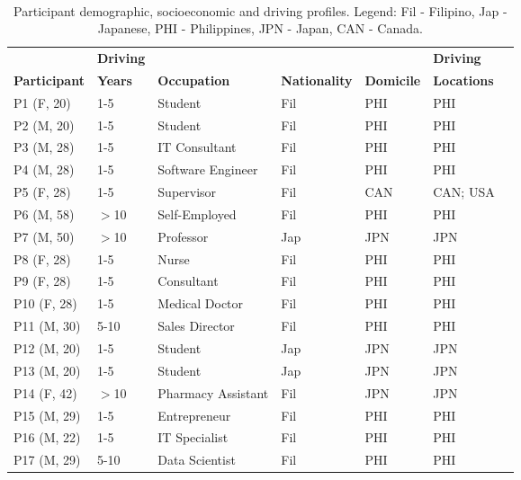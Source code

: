 \begin{table}[t]
	\centering
    \caption{Participant demographic, socioeconomic and driving profiles. Legend: Fil - Filipino, Jap - Japanese, PHI - Philippines, JPN - Japan, CAN - Canada.}~\label{tab:s1-demographic}
    \begin{tabular}{l l l l l l l}
      & {\textbf{Driving}} & & & & {\textbf{Driving }}\\
      {\textbf{Participant}}
      & {\textbf{Years}}
      & {\textbf{Occupation}}
      & {\textbf{Nationality}} 
      & {\textbf{Domicile}}
      & {\textbf{Locations}}\\
      \hline
      P1 (F, 20) & 1-5 & Student & Fil & PHI & PHI \\
      P2 (M, 20) & 1-5 & Student & Fil & PHI & PHI \\
      P3 (M, 28) & 1-5 & IT Consultant & Fil & PHI & PHI \\
      P4 (M, 28) & 1-5 & Software Engineer & Fil & PHI & PHI \\
      P5 (F, 28) & 1-5 & Supervisor & Fil & CAN & CAN; USA\\
      P6 (M, 58) & $>$10 & Self-Employed & Fil & PHI & PHI \\
      P7 (M, 50) & $>$10 & Professor & Jap & JPN & JPN \\
      P8 (F, 28) & 1-5 & Nurse & Fil & PHI & PHI \\
      P9 (F, 28) & 1-5 & Consultant & Fil & PHI & PHI \\
      P10 (F, 28) & 1-5 & Medical Doctor & Fil & PHI & PHI \\
      P11 (M, 30) & 5-10 & Sales Director & Fil & PHI & PHI \\
      P12 (M, 20) & 1-5 & Student & Jap & JPN & JPN \\
      P13 (M, 20) & 1-5 & Student & Jap & JPN & JPN \\
      P14 (F, 42) & $>$10 & Pharmacy Assistant & Fil & JPN & JPN \\
      P15 (M, 29) & 1-5 & Entrepreneur & Fil & PHI & PHI \\
      P16 (M, 22) & 1-5 & IT Specialist & Fil & PHI & PHI \\
      P17 (M, 29) & 5-10 & Data Scientist & Fil & PHI & PHI \\
      \hline
    \end{tabular}
\end{table}

